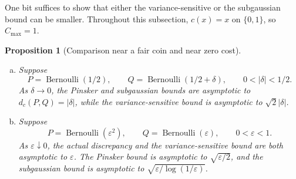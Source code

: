 \documentclass[11pt,twoside]{article}
\newtheorem{proposition}[theorem]{Proposition}
\theoremstyle{definition}
\theoremstyle{remark}
\begin{document}
One bit suffices to show that either the variance-sensitive or the
subgaussian bound can be smaller. Throughout this subsection, \(c(x)=x\)
on \(\{0,1\}\), so \(C_{\max}=1\).

\begin{proposition}[Comparison near a fair coin and near zero cost]
\label{prop:bound-comparison}
\begin{enumerate}[(a)]
\item Suppose
\[
 P=\operatorname{Bernoulli}(1/2),\qquad
 Q=\operatorname{Bernoulli}(1/2+\delta),\qquad 0<|\delta|<1/2.
\]
As \(\delta\to0\), the Pinsker and
subgaussian bounds are asymptotic to \(d_c(P,Q)=|\delta|\), while
the variance-sensitive bound is asymptotic to \(\sqrt2|\delta|\).
\item Suppose
\[
 P=\operatorname{Bernoulli}(\varepsilon^2),\qquad
 Q=\operatorname{Bernoulli}(\varepsilon),\qquad 0<\varepsilon<1.
\]
As \(\varepsilon\downarrow0\), the actual discrepancy and the
variance-sensitive bound are both asymptotic to \(\varepsilon\).
The Pinsker bound is asymptotic to \(\sqrt{\varepsilon/2}\), and
the subgaussian bound is asymptotic to
\(\sqrt{\varepsilon/\log(1/\varepsilon)}\).
\end{enumerate}
\end{proposition}
\end{document}
